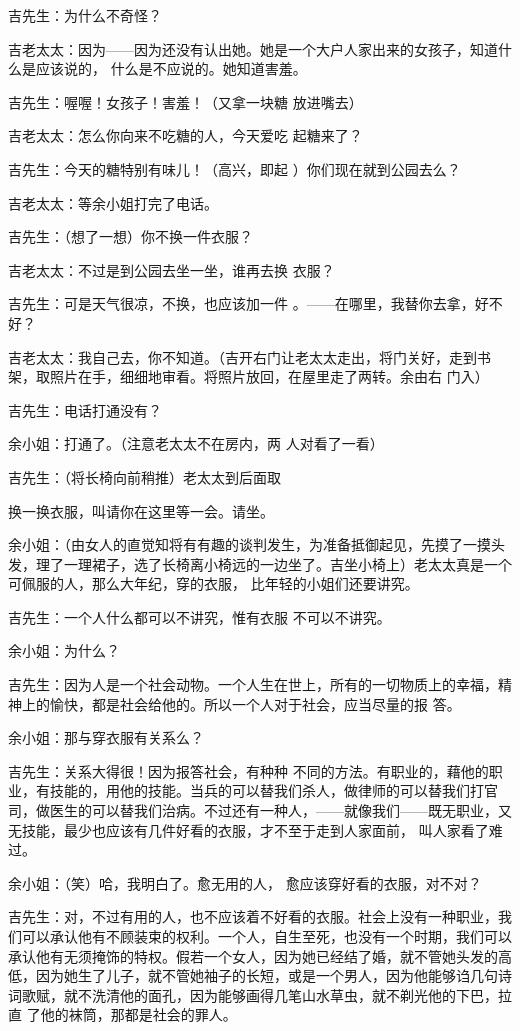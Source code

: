 \documentclass{article}
\begin{document}
吉先生：为什么不奇怪？ 

吉老太太：因为——因为还没有认出她。她是一个大户人家出来的女孩子，知道什么是应该说的，
什么是不应说的。她知道害羞。 

吉先生：喔喔！女孩子！害羞！（又拿一块糖
放进嘴去） 

吉老太太：怎么你向来不吃糖的人，今天爱吃
起糖来了？ 

吉先生：今天的糖特别有味儿！（高兴，即起
）你们现在就到公园去么？ 


\newpage


吉老太太：等余小姐打完了电话。 


吉先生：（想了一想）你不换一件衣服？ 

吉老太太：不过是到公园去坐一坐，谁再去换
衣服？ 

吉先生：可是天气很凉，不换，也应该加一件
。——在哪里，我替你去拿，好不好？ 

吉老太太：我自己去，你不知道。（吉开右门让老太太走出，将门关好，走到书架，取照片在手，细细地审看。将照片放回，在屋里走了两转。余由右
门入） 


吉先生：电话打通没有？ 

余小姐：打通了。（注意老太太不在房内，两
人对看了一看） 

吉先生：（将长椅向前稍推）老太太到后面取
\newpage

换一换衣服，叫请你在这里等一会。请坐。 

余小姐：（由女人的直觉知将有有趣的谈判发生，为准备抵御起见，先摸了一摸头发，理了一理裙子，选了长椅离小椅远的一边坐了。吉坐小椅上）老太太真是一个可佩服的人，那么大年纪，穿的衣服，
比年轻的小姐们还要讲究。 

吉先生：一个人什么都可以不讲究，惟有衣服
不可以不讲究。 


余小姐：为什么？ 

吉先生：因为人是一个社会动物。一个人生在世上，所有的一切物质上的幸福，精神上的愉快，都是社会给他的。所以一个人对于社会，应当尽量的报
答。 


余小姐：那与穿衣服有关系么？ 

吉先生：关系大得很！因为报答社会，有种种
\newpage
不同的方法。有职业的，藉他的职业，有技能的，用他的技能。当兵的可以替我们杀人，做律师的可以替我们打官司，做医生的可以替我们治病。不过还有一种人，——就像我们——既无职业，又无技能，最少也应该有几件好看的衣服，才不至于走到人家面前，
叫人家看了难过。 

余小姐：（笑）哈，我明白了。愈无用的人，
愈应该穿好看的衣服，对不对？ 

吉先生：对，不过有用的人，也不应该着不好看的衣服。社会上没有一种职业，我们可以承认他有不顾装束的权利。一个人，自生至死，也没有一个时期，我们可以承认他有无须掩饰的特权。假若一个女人，因为她已经结了婚，就不管她头发的高低，因为她生了儿子，就不管她袖子的长短，或是一个男人，因为他能够诌几句诗词歌赋，就不洗清他的面孔，因为能够画得几笔山水草虫，就不剃光他的下巴，拉直
了他的袜筒，那都是社会的罪人。 
\end{document}
